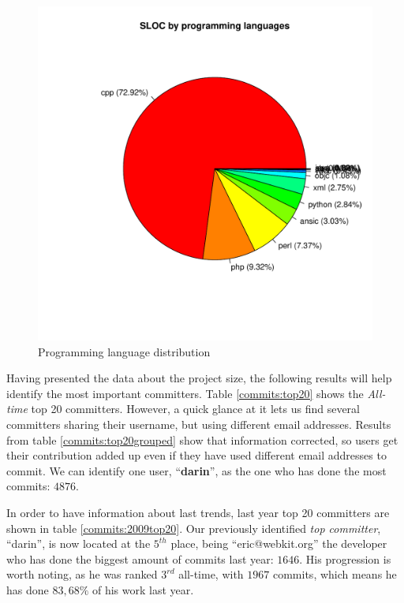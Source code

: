 \begin{figure}[!hptb]
\includegraphics[width=400pt]{images/sloc.pdf}
\caption{Programming language distribution}
\label{sloccount:summary}
\end{figure}

Having presented the data about the project size, the following results will help identify the most important committers. Table \ref{commits:top20} shows the {\it All-time} top 20 committers. However, a quick glance at it lets us find several committers sharing their username, but using different email addresses. Results from table \ref{commits:top20grouped} show that information corrected, so users get their contribution added up even if they have used different email addresses to commit. We can identify one user, ``\textbf{darin}'', as the one who has done the most commits: $4876$.





In order to have information about last trends, last year top 20 committers are shown in table \ref{commits:2009top20}. Our previously identified {\it top committer}, ``darin'', is now located at the $5^{th}$ place, being ``eric@webkit.org'' the developer who has done the biggest amount of commits last year: $1646$. His progression is worth noting, as he was ranked $3^{rd}$ all-time, with $1967$ commits, which means he has done  $83,68\%$ of his work last year.


